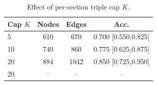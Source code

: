 \begin{table}[t]
\centering
\caption{Effect of per-section triple cap $K$.}
\label{tab:cap}
\begin{tabular}{lccc}
\toprule
Cap $K$ & Nodes & Edges & Acc. \\
\midrule
5 & 610 & 670 & 0.700 [0.550,0.825] \\
10 & 740 & 860 & 0.775 [0.625,0.875] \\
20 & 884 & 1042 & 0.850 [0.725,0.950] \\
20 & -- & -- & -- \\
\bottomrule
\end{tabular}
\end{table}